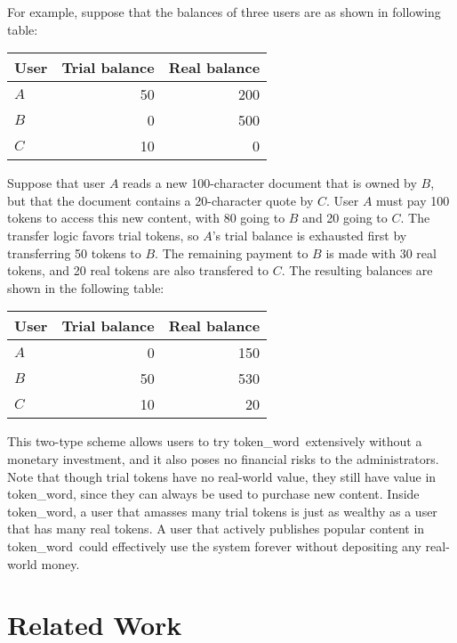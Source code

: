 \documentclass{acm_proc_article-sp}
\newcommand{\tokenWord}{token\_word}
\begin{document}
For example, suppose that the balances of three users are as shown in following table:
\begin{center}
\begin{tabular}{|l||r|r|}
\hline
User&Trial balance &Real balance\\
\hline
$A$&50 &200\\
\hline
$B$&0  &500\\
\hline
$C$&10 &0  \\
\hline
\end{tabular}
\end{center}
Suppose that user $A$ reads a new 100-character document that is owned by $B$, but that the document contains a 20-character quote by $C$.
User $A$ must pay 100 tokens to access this new content, with 80 going to $B$ and 20 going to $C$.
The transfer logic favors trial tokens, so $A$'s trial balance is exhausted first by transferring 50 tokens to $B$.
The remaining payment to $B$ is made with 30 real tokens, and 20 real tokens are also transfered to $C$.
The resulting balances are shown in the following table:
\begin{center}
\begin{tabular}{|l||r|r|}
\hline
User&Trial balance &Real balance\\
\hline
$A$&0 &150\\
\hline
$B$&50  &530\\
\hline
$C$&10 &20  \\
\hline
\end{tabular}
\end{center}



This two-type scheme allows users to try \tokenWord \  extensively without a monetary investment, and it also poses no financial risks to the administrators.
Note that though trial tokens have no real-world value, they still have value in \tokenWord, since they can always be used to purchase new content.
Inside \tokenWord, a user that amasses many trial tokens is just as wealthy as a user that has many real tokens.
A user that actively publishes popular content in \tokenWord \  could effectively use the system forever without depositing any real-world money.

\section{Related Work}
\label{sec:RelatedWork}
\end{document}
